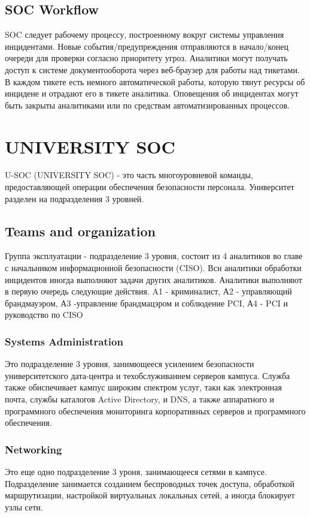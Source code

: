 \documentclass[12pt,]{article}
\begin{document}
\subsection{SOC Workflow}
SOC следует рабочему процессу, построенному вокруг системы управления инцидентами. Новые события/предупреждения отправляются в начало/конец очереди для проверки согласно приоритету угроз. Аналитики могут получать доступ к системе документооборота через веб-браузер для работы над тикетами. В каждом тикете есть немного автоматической работы, которую тянут ресурсы об инцидене и отрадают его в тикете аналитика. Оповещения об инцидентах могут быть закрыты аналитиками или по средствам автоматизированных процессов.
\section{UNIVERSITY SOC}
U-SOC (UNIVERSITY SOC)  - это часть многоуровневой команды, предоставляющей операции обеспечения безопасности персонала. Университет разделен на подразделения 3 уровней.
\subsection{Teams and organization}
Группа эксплуатации - подразделение 3 уровня, состоит из 4 аналитиков во главе с начальником информационной безопасности (CISO). Всн аналитики обработки инцидентов иногда выполняют задачи других аналитиков. Аналитики выполняют в первую очередь следующие действия. A1 - криминалист, А2 - управляющий брандмауэром, А3 -управление брандмацэром и соблюдение PCI, А4 - PCI и руководство по CISO
\subsubsection{Systems Administration}
Это подразделение 3 уровня, занимющееся усилением безопасности университетского дата-центра и техобслуживанием серверов кампуса. Служба также обиспечивает кампус широким спектром услуг, таки как электронная почта, службы каталогов  Active Directory, и DNS, а также аппаратного и программного обеспечения мониторинга корпоративных серверов и программного обеспечения.
\subsubsection{Networking}
Это еще одно подразделение 3 уроня, занимающееся сетями в кампусе. Подразделение занимается созданием беспроводных точек доступа, обработкой маршрутизации, настройкой виртуальных локальных сетей, а иногда блокирует узлы сети.
\end{document}

